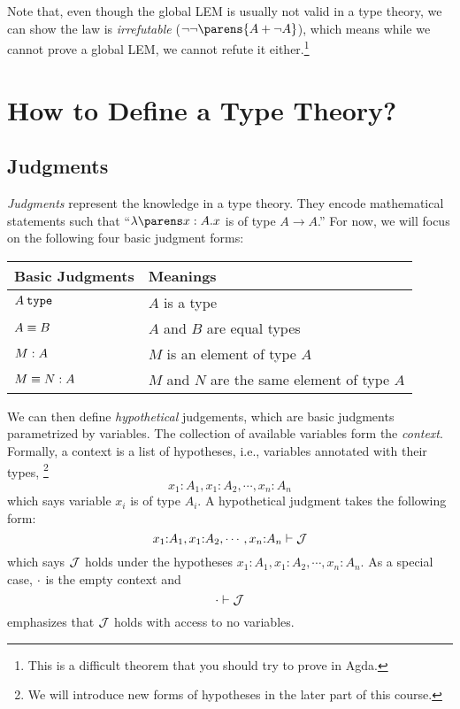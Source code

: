 \documentclass[11pt]{article}
\begin{document}
Note that, even though the global LEM is usually not valid in a type theory, we can show the law is \emph{irrefutable} ($\neg \neg \parens{\sumtype{A}{\neg A}}$), which means while we cannot prove a global LEM, we cannot refute it either.\footnote{This is a difficult theorem that you should try to prove in Agda.}

\section{How to Define a Type Theory?}

\subsection{Judgments}

\emph{Judgments} represent the knowledge in a type theory.
They encode mathematical statements such that ``$\lam{x}[A]{x}$ is of type $A \to A$.''
For now, we will focus on the following four basic judgment forms:

\begin{center}
  \begin{tabular}{ll}
    \toprule
    Basic Judgments & Meanings \\
    \midrule
    $\istype{A}$ & $A$ is a type \\
    $\eqtype{A}{B}$ & $A$ and $B$ are equal types \\
    $\oftype{M}{A}$ & $M$ is an element of type $A$ \\
    $\eqterm{M}{N}{A}$ & $M$ and $N$ are the same element of type $A$ \\
    \bottomrule
  \end{tabular}
\end{center}

We can then define \emph{hypothetical} judgements, which are basic judgments parametrized by variables.
The collection of available variables form the \emph{context}.
Formally, a context is a list of hypotheses, i.e., variables annotated with their types,%
\footnote{We will introduce new forms of hypotheses in the later part of this course.}
\[
  x_1{:}A_1, x_1{:}A_2, \cdots, x_n{:}A_n
\]
which says variable $x_i$ is of type $A_i$.
A hypothetical judgment takes the following form:
\[
  \entails{x_1{:}A_1, x_1{:}A_2, \cdots, x_n{:}A_n}{\JJ}
\]
which says $\mathcal{J}$ holds under the hypotheses $x_1{:}A_1, x_1{:}A_2, \cdots, x_n{:}A_n$.
As a special case, $\cdot$ is the empty context and
\[
  \entails{\emptyctx}{\JJ}
\]
emphasizes that $\mathcal{J}$ holds with access to no variables.
\end{document}
